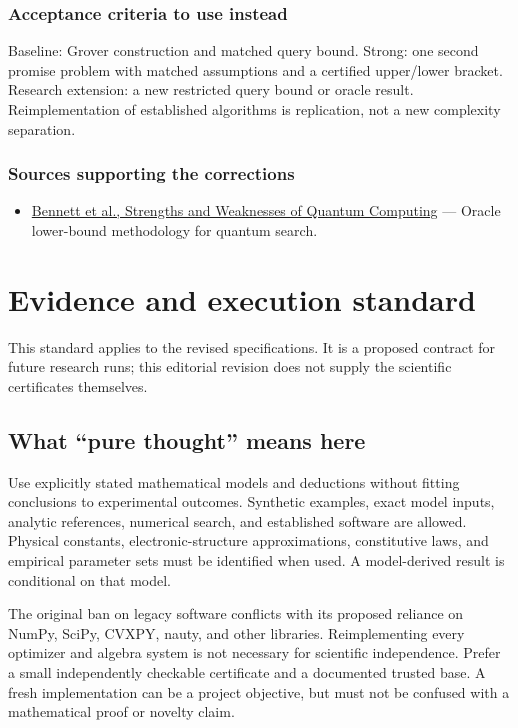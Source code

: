 \documentclass[
  11pt,
]{article}
\providecommand{\tightlist}{%
  \setlength{\itemsep}{0pt}\setlength{\parskip}{0pt}}
\begin{document}
\subsubsection{Acceptance criteria to use instead}

Baseline: Grover construction and matched query bound. Strong: one
second promise problem with matched assumptions and a certified
upper/lower bracket. Research extension: a new restricted query bound or
oracle result. Reimplementation of established algorithms is
replication, not a new complexity separation.

\subsubsection{Sources supporting the corrections}

\begin{itemize}
\tightlist
\item
  \href{https://arxiv.org/abs/quant-ph/9701001}{Bennett et al.,
  Strengths and Weaknesses of Quantum Computing} --- Oracle lower-bound
  methodology for quantum search.
\end{itemize}

\section{Evidence and execution standard}

This standard applies to the revised specifications. It is a proposed
contract for future research runs; this editorial revision does not
supply the scientific certificates themselves.

\subsection{What ``pure thought'' means here}

Use explicitly stated mathematical models and deductions without fitting
conclusions to experimental outcomes. Synthetic examples, exact model
inputs, analytic references, numerical search, and established software
are allowed. Physical constants, electronic-structure approximations,
constitutive laws, and empirical parameter sets must be identified when
used. A model-derived result is conditional on that model.

The original ban on legacy software conflicts with its proposed reliance
on NumPy, SciPy, CVXPY, nauty, and other libraries. Reimplementing every
optimizer and algebra system is not necessary for scientific
independence. Prefer a small independently checkable certificate and a
documented trusted base. A fresh implementation can be a project
objective, but must not be confused with a mathematical proof or novelty
claim.
\end{document}
